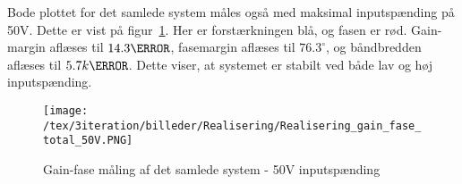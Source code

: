 \noindent Bode plottet for det samlede system måles også med maksimal inputspænding på 50V. Dette er vist på figur~\ref{fig:Realisering_total_50V_3}. Her er forstærkningen blå, og fasen er rød. Gain-margin aflæses til $14.3\decibel$, fasemargin aflæses til $76.3^\circ$, og båndbredden aflæses til $5.7k\hertz$. Dette viser, at systemet er stabilt ved både lav og høj inputspænding.

\begin{figure}[H]
	\center
	\texttt{[image: /tex/3iteration/billeder/Realisering/Realisering\_gain\_fase\_total\_50V.PNG]}
	\caption{Gain-fase måling af det samlede system - 50V inputspænding}
	\label{fig:Realisering_total_50V_3}
\end{figure}





